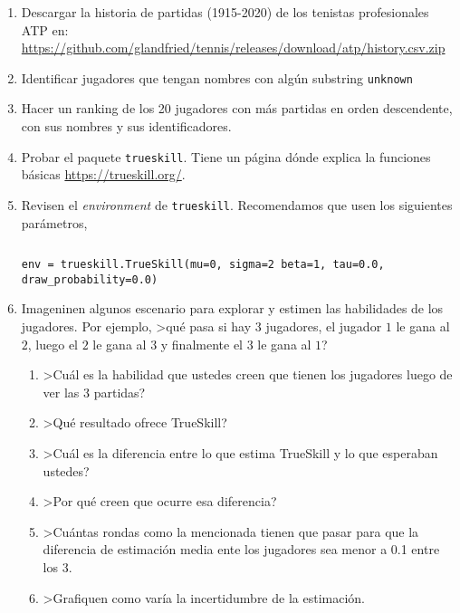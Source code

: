 \documentclass[a4paper,10pt]{article}
\begin{document}
\begin{enumerate}
 \item Descargar la historia de partidas (1915-2020) de los tenistas profesionales ATP en: \url{https://github.com/glandfried/tennis/releases/download/atp/history.csv.zip}
 \item Identificar jugadores que tengan nombres con algún substring \texttt{unknown}
 \item Hacer un ranking de los 20 jugadores con más partidas en orden descendente, con sus nombres y sus identificadores.
 \item Probar el paquete \texttt{trueskill}. Tiene un página dónde explica la funciones básicas \url{https://trueskill.org/}.
 \item Revisen el \emph{environment} de \texttt{trueskill}.
    Recomendamos que usen los siguientes parámetros,

    \begin{lstlisting}[backgroundcolor=\color{white},label=lst:env, caption=\relax, belowskip=-1.0 \baselineskip, aboveskip=-0 \baselineskip]
    \end{lstlisting}
    \begin{lstlisting}[backgroundcolor=\color{all}]
    env = trueskill.TrueSkill(mu=0, sigma=2 beta=1, tau=0.0, draw_probability=0.0)
    \end{lstlisting}  
 \item Imageninen algunos escenario para explorar y estimen las habilidades de los jugadores. Por ejemplo, >qué pasa si hay 3 jugadores, el jugador $1$ le gana al $2$, luego el $2$ le gana al $3$ y finalmente el $3$ le gana al $1$?
    \begin{enumerate}
    \item >Cuál es la habilidad que ustedes creen que tienen los jugadores luego de ver las 3 partidas?
    \item >Qué resultado ofrece TrueSkill?
    \item >Cuál es la diferencia entre lo que estima TrueSkill y lo que esperaban ustedes?
    \item >Por qué creen que ocurre esa diferencia?
    \item >Cuántas rondas como la mencionada tienen que pasar para que la diferencia de estimación media ente los jugadores sea menor a 0.1 entre los 3.
    \item >Grafiquen como varía la incertidumbre de la estimación.
    \end{enumerate}
\end{enumerate}
\end{document}
